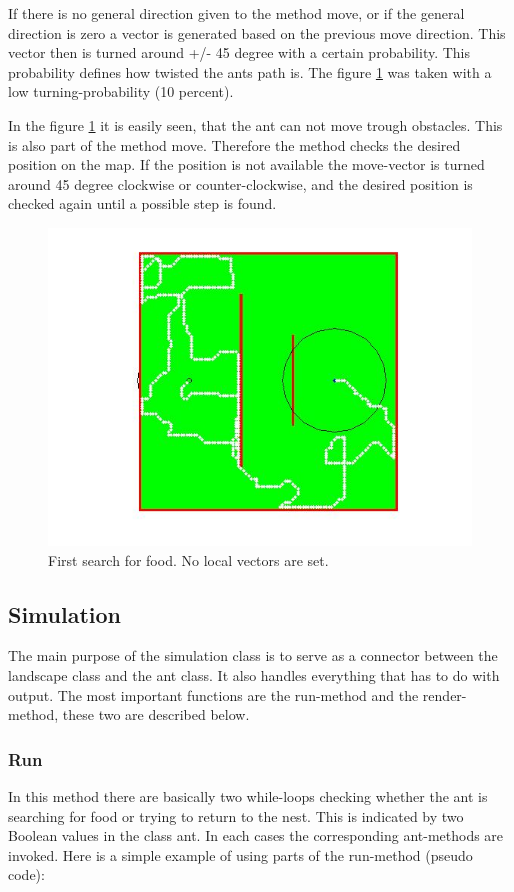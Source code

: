 \documentclass[11pt]{article}
\begin{document}
If there is no general direction given to the method move, or if the general direction is zero a vector is generated based on the previous move direction. This vector then is turned around +/- 45 degree with a certain probability. This probability defines how twisted the ants path is. The figure \ref{firstrun} was taken with a low turning-probability (10 percent).

In the figure \ref{firstrun} it is easily seen, that the ant can not move trough obstacles. This is also part of the method move. Therefore the method checks the desired position on the map. If the position is not available the move-vector is turned around 45 degree clockwise or counter-clockwise, and the desired position is checked again until a possible step is found.

\begin{figure}[h!]
   \centering
   \includegraphics[scale=0.6]{images/foodsearch.jpg}
   \caption[Ants first search for food]{First search for food. No local vectors are set.}
\label{firstrun}
\end{figure}

\subsection{Simulation}
The main purpose of the simulation class is to serve as a connector between the landscape class and the ant class. It also handles everything that has to do with output. The most important functions are the run-method and the render-method, these two are described below.

\subsubsection{Run}
In this method there are basically two while-loops checking whether the ant is searching for food or trying to return to the nest. This is indicated by two Boolean values in the class ant. In each cases the corresponding ant-methods are invoked. Here is a simple example of using parts of the run-method (pseudo code):
\end{document}

